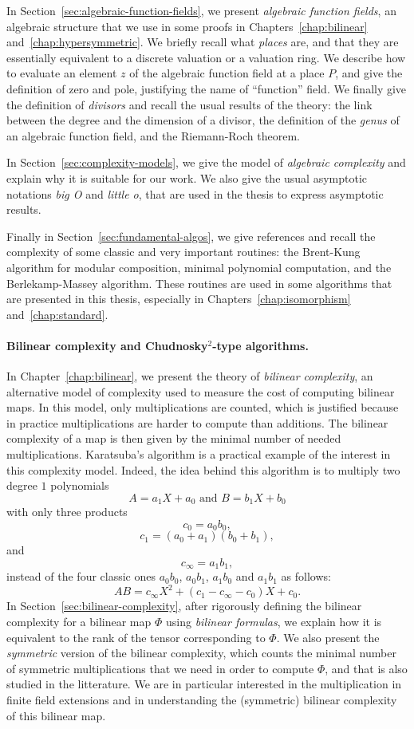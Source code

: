 In Section~\ref{sec:algebraic-function-fields}, we present \emph{algebraic
function fields}, an algebraic structure that we use in some proofs in
Chapters~\ref{chap:bilinear} and~\ref{chap:hypersymmetric}. We briefly recall
what \emph{places} are, and that they are essentially equivalent to a discrete
valuation or a valuation ring. We describe how to evaluate an element
$z$ of the algebraic function field at a place $P$, and give the definition of
zero and pole, justifying the name of ``function'' field. We finally give the
definition of \emph{divisors} and recall the usual results of the theory: the
link between the degree and the dimension of a divisor, the definition of the
\emph{genus} of an algebraic function field, and the Riemann-Roch theorem.

In Section~\ref{sec:complexity-models}, we give the model of \emph{algebraic
complexity} and explain why it is suitable for our work. We also give the usual
asymptotic notations \emph{big O} and \emph{little o}, that are used in the
thesis to express asymptotic results.

Finally in Section~\ref{sec:fundamental-algos}, we give references and recall
the complexity of some classic and very important routines: the Brent-Kung
algorithm for modular composition, minimal polynomial computation, and the
Berlekamp-Massey algorithm. These routines are used in some
algorithms that are presented in this thesis, especially
in Chapters~\ref{chap:isomorphism} and~\ref{chap:standard}.

\paragraph{Bilinear complexity and Chudnosky$^2$-type algorithms.} In
Chapter~\ref{chap:bilinear}, we present the theory of \emph{bilinear
complexity}, an alternative model of complexity used to measure the cost of
computing bilinear maps. In this model, only multiplications are counted, which
is justified because in practice multiplications are harder to compute than
additions. The bilinear complexity of a map is then given by the minimal number
of needed multiplications. Karatsuba's algorithm is a practical example of the
interest in this complexity model. Indeed, the idea behind this algorithm is to
multiply two degree $1$ polynomials
\[
  A = a_1 X + a_0\text{ and }B = b_1 X + b_0
\]
with only three products
\[
  c_0 = a_0b_0,
\]
\[
  c_1 = (a_0+a_1)(b_0+b_1),
\]
and
\[
  c_\infty = a_1b_1,
\]
instead
of the four classic ones $a_0b_0$, $a_0b_1$, $a_1b_0$ and $a_1b_1$ as follows:
\[
  AB = c_\infty X^2 + (c_1-c_\infty-c_0) X + c_0.
\]
In Section~\ref{sec:bilinear-complexity}, after rigorously defining the bilinear
complexity for a bilinear map $\Phi$ using \emph{bilinear formulas}, we explain
how it is equivalent to the rank of the tensor corresponding to $\Phi$. We also
present the \emph{symmetric} version of the bilinear complexity, which counts
the minimal number of symmetric multiplications that we need in order to compute
$\Phi$, and that is also studied in the litterature. We are in particular
interested in the multiplication in finite field extensions and in understanding
the (symmetric) bilinear complexity of this bilinear map.

